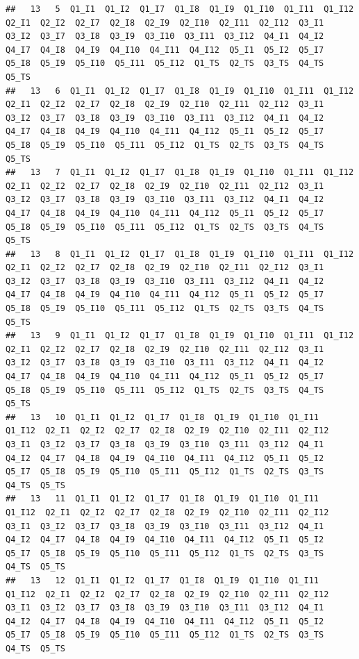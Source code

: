 \documentclass[]{book}
\begin{document}
\begin{verbatim}
##   13   5  Q1_I1  Q1_I2  Q1_I7  Q1_I8  Q1_I9  Q1_I10  Q1_I11  Q1_I12  Q2_I1  Q2_I2  Q2_I7  Q2_I8  Q2_I9  Q2_I10  Q2_I11  Q2_I12  Q3_I1  Q3_I2  Q3_I7  Q3_I8  Q3_I9  Q3_I10  Q3_I11  Q3_I12  Q4_I1  Q4_I2  Q4_I7  Q4_I8  Q4_I9  Q4_I10  Q4_I11  Q4_I12  Q5_I1  Q5_I2  Q5_I7  Q5_I8  Q5_I9  Q5_I10  Q5_I11  Q5_I12  Q1_TS  Q2_TS  Q3_TS  Q4_TS  Q5_TS
##   13   6  Q1_I1  Q1_I2  Q1_I7  Q1_I8  Q1_I9  Q1_I10  Q1_I11  Q1_I12  Q2_I1  Q2_I2  Q2_I7  Q2_I8  Q2_I9  Q2_I10  Q2_I11  Q2_I12  Q3_I1  Q3_I2  Q3_I7  Q3_I8  Q3_I9  Q3_I10  Q3_I11  Q3_I12  Q4_I1  Q4_I2  Q4_I7  Q4_I8  Q4_I9  Q4_I10  Q4_I11  Q4_I12  Q5_I1  Q5_I2  Q5_I7  Q5_I8  Q5_I9  Q5_I10  Q5_I11  Q5_I12  Q1_TS  Q2_TS  Q3_TS  Q4_TS  Q5_TS
##   13   7  Q1_I1  Q1_I2  Q1_I7  Q1_I8  Q1_I9  Q1_I10  Q1_I11  Q1_I12  Q2_I1  Q2_I2  Q2_I7  Q2_I8  Q2_I9  Q2_I10  Q2_I11  Q2_I12  Q3_I1  Q3_I2  Q3_I7  Q3_I8  Q3_I9  Q3_I10  Q3_I11  Q3_I12  Q4_I1  Q4_I2  Q4_I7  Q4_I8  Q4_I9  Q4_I10  Q4_I11  Q4_I12  Q5_I1  Q5_I2  Q5_I7  Q5_I8  Q5_I9  Q5_I10  Q5_I11  Q5_I12  Q1_TS  Q2_TS  Q3_TS  Q4_TS  Q5_TS
##   13   8  Q1_I1  Q1_I2  Q1_I7  Q1_I8  Q1_I9  Q1_I10  Q1_I11  Q1_I12  Q2_I1  Q2_I2  Q2_I7  Q2_I8  Q2_I9  Q2_I10  Q2_I11  Q2_I12  Q3_I1  Q3_I2  Q3_I7  Q3_I8  Q3_I9  Q3_I10  Q3_I11  Q3_I12  Q4_I1  Q4_I2  Q4_I7  Q4_I8  Q4_I9  Q4_I10  Q4_I11  Q4_I12  Q5_I1  Q5_I2  Q5_I7  Q5_I8  Q5_I9  Q5_I10  Q5_I11  Q5_I12  Q1_TS  Q2_TS  Q3_TS  Q4_TS  Q5_TS
##   13   9  Q1_I1  Q1_I2  Q1_I7  Q1_I8  Q1_I9  Q1_I10  Q1_I11  Q1_I12  Q2_I1  Q2_I2  Q2_I7  Q2_I8  Q2_I9  Q2_I10  Q2_I11  Q2_I12  Q3_I1  Q3_I2  Q3_I7  Q3_I8  Q3_I9  Q3_I10  Q3_I11  Q3_I12  Q4_I1  Q4_I2  Q4_I7  Q4_I8  Q4_I9  Q4_I10  Q4_I11  Q4_I12  Q5_I1  Q5_I2  Q5_I7  Q5_I8  Q5_I9  Q5_I10  Q5_I11  Q5_I12  Q1_TS  Q2_TS  Q3_TS  Q4_TS  Q5_TS
##   13   10  Q1_I1  Q1_I2  Q1_I7  Q1_I8  Q1_I9  Q1_I10  Q1_I11  Q1_I12  Q2_I1  Q2_I2  Q2_I7  Q2_I8  Q2_I9  Q2_I10  Q2_I11  Q2_I12  Q3_I1  Q3_I2  Q3_I7  Q3_I8  Q3_I9  Q3_I10  Q3_I11  Q3_I12  Q4_I1  Q4_I2  Q4_I7  Q4_I8  Q4_I9  Q4_I10  Q4_I11  Q4_I12  Q5_I1  Q5_I2  Q5_I7  Q5_I8  Q5_I9  Q5_I10  Q5_I11  Q5_I12  Q1_TS  Q2_TS  Q3_TS  Q4_TS  Q5_TS
##   13   11  Q1_I1  Q1_I2  Q1_I7  Q1_I8  Q1_I9  Q1_I10  Q1_I11  Q1_I12  Q2_I1  Q2_I2  Q2_I7  Q2_I8  Q2_I9  Q2_I10  Q2_I11  Q2_I12  Q3_I1  Q3_I2  Q3_I7  Q3_I8  Q3_I9  Q3_I10  Q3_I11  Q3_I12  Q4_I1  Q4_I2  Q4_I7  Q4_I8  Q4_I9  Q4_I10  Q4_I11  Q4_I12  Q5_I1  Q5_I2  Q5_I7  Q5_I8  Q5_I9  Q5_I10  Q5_I11  Q5_I12  Q1_TS  Q2_TS  Q3_TS  Q4_TS  Q5_TS
##   13   12  Q1_I1  Q1_I2  Q1_I7  Q1_I8  Q1_I9  Q1_I10  Q1_I11  Q1_I12  Q2_I1  Q2_I2  Q2_I7  Q2_I8  Q2_I9  Q2_I10  Q2_I11  Q2_I12  Q3_I1  Q3_I2  Q3_I7  Q3_I8  Q3_I9  Q3_I10  Q3_I11  Q3_I12  Q4_I1  Q4_I2  Q4_I7  Q4_I8  Q4_I9  Q4_I10  Q4_I11  Q4_I12  Q5_I1  Q5_I2  Q5_I7  Q5_I8  Q5_I9  Q5_I10  Q5_I11  Q5_I12  Q1_TS  Q2_TS  Q3_TS  Q4_TS  Q5_TS

\end{verbatim}
\end{document}
